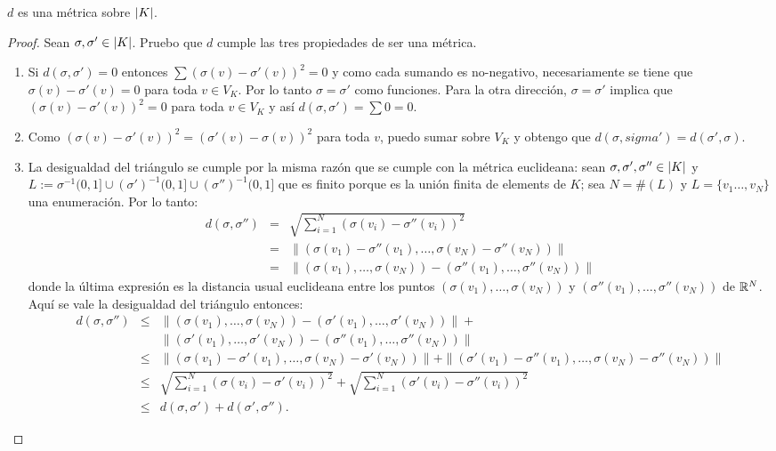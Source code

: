 \begin{ejercicio}\label{ej:48}
  $d$ es una m\'etrica sobre $\left| K \right|$.
\end{ejercicio}
\begin{proof}%
  Sean $\sigma,\sigma'\in\left| K \right|$.
  Pruebo que $d$ cumple las tres propiedades de ser una m\'etrica.
  \begin{enumerate}
  \item Si $d(\sigma,\sigma')=0$ entonces $\sum(\sigma(v)-\sigma'(v))^2=0$ y como cada sumando es
    no-negativo, necesariamente se tiene que $\sigma(v)-\sigma'(v)=0$ para toda $v\in V_K$. Por
    lo tanto $\sigma=\sigma'$ como funciones. Para la otra direcci\'on, $\sigma=\sigma'$ implica que
    $(\sigma(v)-\sigma'(v))^2=0$ para toda $v\in V_K$ y as\'i $d(\sigma,\sigma')=\sum 0=0$.
  \item Como $(\sigma(v)-\sigma'(v))^2=(\sigma'(v)-\sigma(v))^2$ para toda $v$, puedo sumar sobre
    $V_K$ y obtengo que $d(\sigma,sigma')=d(\sigma',\sigma)$.
  \item La desigualdad del tri\'angulo se cumple por la misma raz\'on que se cumple con la m\'etrica
    euclideana: sean $\sigma,\sigma',\sigma''\in\left| K \right|$ y
    $L:=\sigma^{-1}(0,1]\cup(\sigma')^{-1}(0,1]\cup(\sigma'')^{-1}(0,1]$ que es finito porque es la
    uni\'on finita de elements de $K$; sea $N=\#(L)$ y $L=\{v_1\ldots,v_N\}$ una enumeraci\'on. Por
    lo tanto:
    \begin{eqnarray*}
      d(\sigma,\sigma'')&=&
      \sqrt{\sum_{i=1}^N(\sigma(v_i)-\sigma''(v_i))^2}\\ &=&
      \|(\sigma(v_1)-\sigma''(v_1),\ldots,\sigma(v_N)-\sigma''(v_N))\|\\ &=&
      \|(\sigma(v_1),\ldots,\sigma(v_N))-(\sigma''(v_1),\ldots,\sigma''(v_N))\|
    \end{eqnarray*}
    donde la \'ultima expresi\'on es la distancia usual euclideana entre los puntos
    $(\sigma(v_1),\ldots,\sigma(v_N))$ y $(\sigma''(v_1),\ldots,\sigma''(v_N))$ de $\mathbb{R}^N$.
    Aqu\'i se vale la desigualdad del tri\'angulo entonces:
    \begin{eqnarray*}
      d(\sigma,\sigma'')&\leq&
      \|(\sigma(v_1),\ldots,\sigma(v_N))-(\sigma'(v_1),\ldots,\sigma'(v_N))\|+\\ &&
      \|(\sigma'(v_1),\ldots,\sigma'(v_N))-(\sigma''(v_1),\ldots,\sigma''(v_N))\|\\ &\leq&
      \|(\sigma(v_1)-\sigma'(v_1),\ldots,\sigma(v_N)-\sigma'(v_N))\|+
      \|(\sigma'(v_1)-\sigma''(v_1),\ldots,\sigma(v_N)-\sigma''(v_N))\| \\ &\leq &
      \sqrt{\sum_{i=1}^N(\sigma(v_i)-\sigma'(v_i))^2}+
      \sqrt{\sum_{i=1}^N(\sigma'(v_i)-\sigma''(v_i))^2}\\ &\leq&
      d(\sigma,\sigma')+d(\sigma',\sigma'').
    \end{eqnarray*}
    
    
  \end{enumerate}
\end{proof}%

